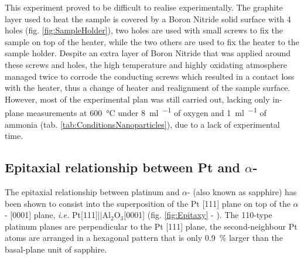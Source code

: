 
This experiment proved to be difficult to realise experimentally.
The graphite layer used to heat the sample is covered by a Boron Nitride solid surface with 4 holes (fig. \ref{fig:SampleHolder}), two holes are used with small screws to fix the sample on top of the heater, while the two others are used to fix the heater to the sample holder.
Despite an extra layer of Boron Nitride that was applied around these screws and holes, the high temperature and highly oxidating atmosphere managed twice to corrode the conducting screws which resulted in a contact loss with the heater, thus a change of heater and realignment of the sample surface.
However, most of the experimental plan was still carried out, lacking only in-plane measurements at \qty{600}{\degreeCelsius} under \qty{8}{\ml\per\min} of oxygen and \qty{1}{\ml\per\min} of ammonia (tab. \ref{tab:ConditionsNanoparticles}), due to a lack of experimental time.

\subsection{Epitaxial relationship between Pt and $\alpha$-}

The epitaxial relationship between platinum and $\alpha$- (also known as sapphire) has been shown to consist into the superposition of the Pt [111] plane on top of the $\alpha$- [0001] plane, \textit{i.e.} Pt[111]||Al$_2$O$_3$[0001] (fig. \ref{fig:Epitaxy} - \cite{Farrow1993}).
The {110}-type platinum planes are perpendicular to the Pt [111] plane, the second-neighbour Pt atoms are arranged in a hexagonal pattern that is only \qty{0.9}{\percent} larger than the basal-plane unit of sapphire.

